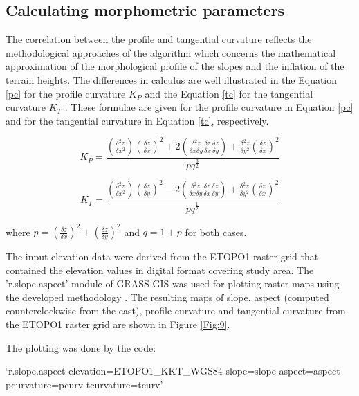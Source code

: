 \documentclass[technologies,article,submit,pdftex,moreauthors]{Definitions/mdpi}
\begin{document}
\subsection{Calculating morphometric parameters}

The correlation between the profile and tangential curvature reflects the methodological approaches of the algorithm which concerns the mathematical approximation of the morphological profile of the slopes and the inflation of the terrain heights. The differences in calculus are well illustrated in the Equation \ref{pc} for the profile curvature $K_P$ \cite{Golden} and the Equation \ref{tc} for the tangential curvature $K_T$ \cite{Golden}. These formulae are given for the profile curvature in Equation \ref{pc} and for the tangential curvature in Equation \ref{tc}, respectively. 

\begin{equation}
  \label{pc}
 K_P=\frac{\left(\frac{\delta^2 z}{\delta x^2}\right) \left(\frac{\delta z}{\delta x}\right)^2 + 2\left(\frac{\delta^2 z}{\delta x \delta y}\frac{\delta z}{\delta x}\frac{\delta z}{\delta y} \right) + \frac{\delta^2 z}{\delta y^2} \left(\frac{\delta z}{\delta x}\right)^2}{pq^\frac{3}{2}}
\end{equation}

\begin{equation}
  \label{tc}
 K_T=\frac{\left(\frac{\delta^2 z}{\delta x^2}\right) \left(\frac{\delta z}{\delta y}\right)^2 - 2\left(\frac{\delta^2 z}{\delta x \delta y}\frac{\delta z}{\delta x}\frac{\delta z}{\delta y} \right) + \frac{\delta^2 z}{\delta y^2} \left(\frac{\delta z}{\delta x}\right)^2}{pq^\frac{1}{2}}
\end{equation}

where $p=\left(\frac{\delta z}{\delta x}\right)^2+\left(\frac{\delta z}{\delta y}\right)^2$ and $q=1+p$ for both cases.
 
The input elevation data were derived from the ETOPO1 raster grid that contained the elevation values in digital format covering study area. The 'r.slope.aspect' module of GRASS GIS was used for plotting raster maps using the developed methodology \cite{Mitasova1985,Hofierka2009,Horn}. The resulting maps of slope, aspect (computed counterclockwise from the east), profile curvature and tangential curvature from the ETOPO1 raster grid are shown in Figure \ref{Fig:9}.

The plotting was done by the code: 

\begin{spverbatim}
‘r.slope.aspect elevation=ETOPO1_KKT_WGS84 slope=slope aspect=aspect 
pcurvature=pcurv tcurvature=tcurv’
\end{spverbatim}
\end{document}
